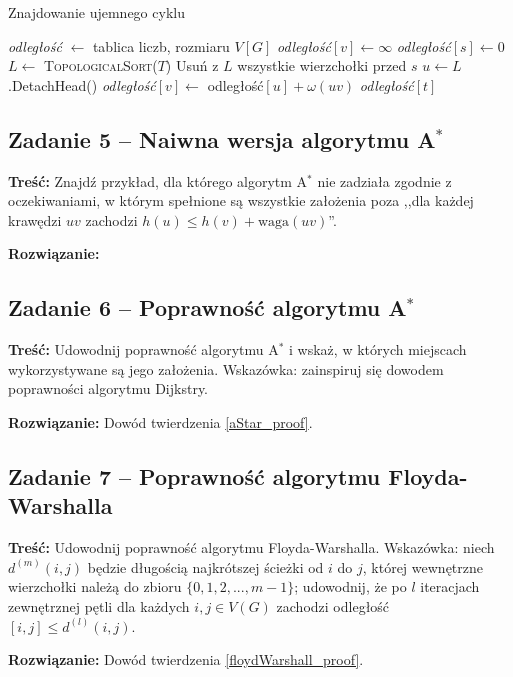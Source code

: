 \begin{algorithm}[H]
	\caption{Znajdowanie ujemnego cyklu}
	\begin{algorithmic}[1]
		\State \textit{odległość} $\gets$ tablica liczb, rozmiaru $V[G]$
		\State \textit{odległość}$[v] \gets \infty$
		\EndFor
		\State \textit{odległość}$[s] \gets 0$
		\State $L \gets$ \textsc{TopologicalSort}($T$) 
		\State Usuń z $L$ wszystkie wierzchołki przed $s$
		\State $u \gets L$.DetachHead()
		\State \textit{odległość}$[v] \gets $ {odległość}$[u] + \omega(uv)$
		\EndIf
		\EndFor
		\EndWhile
		\State \Return \textit{odległość}$[t]$
		\EndProcedure
	\end{algorithmic}
	\label{Zadanie34}
\end{algorithm}

\subsection{Zadanie 5 -- Naiwna wersja algorytmu A\texorpdfstring{$^*$}{TEXT}}
\textbf{Treść: } Znajdź przykład, dla 
którego algorytm A$^*$ nie zadziała zgodnie z oczekiwaniami, 
w którym spełnione
są wszystkie założenia 
poza 
,,dla każdej krawędzi $uv$ zachodzi $h(u) \leq h(v) + \text{waga}(uv)$''.

\textbf{Rozwiązanie: }

\subsection{Zadanie 6 -- Poprawność algorytmu A\texorpdfstring{$^*$}{TEXT}}
\textbf{Treść: } Udowodnij poprawność algorytmu 
A$^*$ i wskaż, w których miejscach wykorzystywane są jego założenia.
Wskazówka: zainspiruj się dowodem poprawności algorytmu Dijkstry.

\textbf{Rozwiązanie: } Dowód twierdzenia \ref{aStar_proof}.

\subsection{Zadanie 7 -- Poprawność algorytmu Floyda-Warshalla}
\textbf{Treść:} Udowodnij poprawność algorytmu Floyda-Warshalla. 
Wskazówka: niech 
$d^{(m)}(i, j)$ będzie długością
najkrótszej ścieżki od $i$ do $j$, której wewnętrzne wierzchołki należą
do zbioru $\{0, 1, 2, . . . , m - 1\}$; 
udowodnij, że po $l$
iteracjach zewnętrznej pętli dla każdych $i, j \in V (G)$ zachodzi 
odległość$[i, j] \leq d^{(l)}(i, j)$.

\textbf{Rozwiązanie:} Dowód twierdzenia \ref{floydWarshall_proof}.
